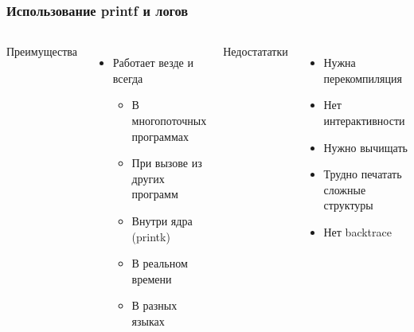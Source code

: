 \begin{frame}
 \frametitle{Использование printf и логов}
 \begin{columns}
    \begin{center}
     Преимущества 
    \end{center}
    \begin{itemize}
     \item Работает везде и всегда
     \begin{itemize}
       \item В многопоточных программах
       \item При вызове из других программ
       \item Внутри ядра (printk)
       \item В реальном времени
       \item В разных языках
      \end{itemize}
    \end{itemize}
    \begin{center}
     Недостататки
    \end{center}
    \begin{itemize}
     \item Нужна перекомпиляция
     \item Нет интерактивности
     \item Нужно вычищать
     \item Трудно печатать сложные структуры
     \item Нет backtrace
    \end{itemize}
 \end{columns}
\end{frame}
